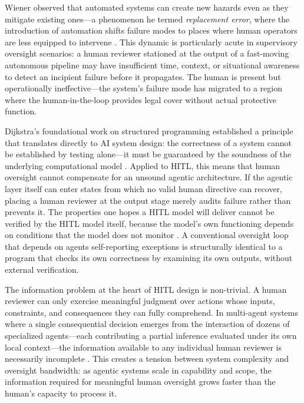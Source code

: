 Wiener observed that automated systems can create new hazards even as they mitigate existing ones—a phenomenon he termed \emph{replacement error}, where the introduction of automation shifts failure modes to places where human operators are less equipped to intervene \cite{wiener1948}. This dynamic is particularly acute in supervisory oversight scenarios: a human reviewer stationed at the output of a fast-moving autonomous pipeline may have insufficient time, context, or situational awareness to detect an incipient failure before it propagates. The human is present but operationally ineffective—the system's failure mode has migrated to a region where the human-in-the-loop provides legal cover without actual protective function.

Dijkstra's foundational work on structured programming established a principle that translates directly to AI system design: the correctness of a system cannot be established by testing alone—it must be guaranteed by the soundness of the underlying computational model \cite{dijkstra1982}. Applied to HITL, this means that human oversight cannot compensate for an unsound agentic architecture. If the agentic layer itself can enter states from which no valid human directive can recover, placing a human reviewer at the output stage merely audits failure rather than prevents it. The properties one hopes a HITL model will deliver cannot be verified by the HITL model itself, because the model's own functioning depends on conditions that the model does not monitor \cite{dijkstra1982}. A conventional oversight loop that depends on agents self-reporting exceptions is structurally identical to a program that checks its own correctness by examining its own outputs, without external verification.

The information problem at the heart of HITL design is non-trivial. A human reviewer can only exercise meaningful judgment over actions whose inputs, constraints, and consequences they can fully comprehend. In multi-agent systems where a single consequential decision emerges from the interaction of dozens of specialized agents—each contributing a partial inference evaluated under its own local context—the information available to any individual human reviewer is necessarily incomplete \cite{tristr81}. This creates a tension between system complexity and oversight bandwidth: as agentic systems scale in capability and scope, the information required for meaningful human oversight grows faster than the human's capacity to process it.


